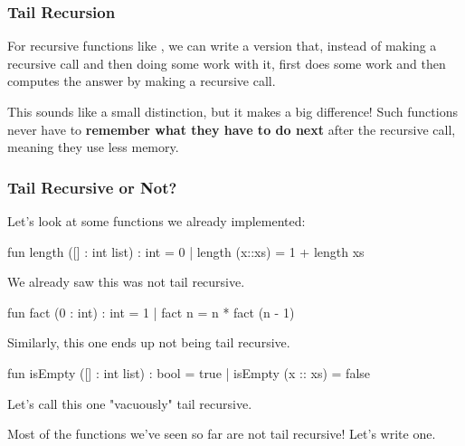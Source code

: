 \documentclass[aspectratio=169]{beamer}
\begin{document}
\begin{frame}[fragile]
  \frametitle{Tail Recursion}

  For recursive functions like , we can write a version that, instead of making a
  recursive call and then doing some work with it, first does some work and then computes the
  answer by making a recursive call.

  \pause
  \vspace{\fill}

  This sounds like a small distinction, but it makes a big difference! Such functions never have
  to \textbf{remember what they have to do next} after the recursive call, meaning they use less
  memory.
  
  \pause
  \vspace{\fill}

\end{frame}

\begin{frame}[fragile]
  \frametitle{Tail Recursive or Not?}

  Let's look at some functions we already implemented:

  \pause
  \begin{codeblock}
    fun length ([] : int list) : int = 0
      | length (x::xs) = 1 + length xs
  \end{codeblock}

  \pause
  We already saw this was not tail recursive.

  \pause
  \begin{codeblock}
    fun fact (0 : int) : int = 1 
      | fact n = n * fact (n - 1)
  \end{codeblock}

  \pause
  Similarly, this one ends up not being tail recursive.

  \pause
  \begin{codeblock}
    fun isEmpty ([] : int list) : bool = true
      | isEmpty (x :: xs) = false
  \end{codeblock}

  \pause
  Let's call this one "vacuously" tail recursive.

  \pause
  \vspace{\fill}

  Most of the functions we've seen so far are not tail recursive! Let's write one.
\end{frame}
\end{document}
